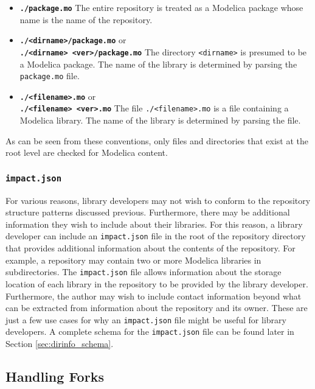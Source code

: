 \documentclass[11pt,a4paper,twocolumn]{article}
\newcommand{\code}[1]{\texttt{#1}} %
\begin{document}
\begin{itemize}[noitemsep]
  \item \textbf{\code{./package.mo}} The entire repository is treated as a Modelica
    package whose name is the name of the repository.

  \item \textbf{\code{./<dirname>/package.mo}} or\\  \textbf{\code{./<dirname>
      <ver>/package.mo}} The directory \code{<dirname>} is presumed to
    be a Modelica package.  The name of the library is determined by
    parsing the \code{package.mo} file.

  \item \textbf{\code{./<filename>.mo}} or\\ \textbf{\code{./<filename> <ver>.mo}} The
    file \code{./<filename>.mo} is a file containing a Modelica
    library.  The name of the library is determined by parsing the
    file.
\end{itemize}

As can be seen from these conventions, only files and directories that
exist at the root level are checked for Modelica content.

\subsubsection{\code{impact.json}}
\label{sec:dirinfo}

For various reasons, library developers may not wish to conform to the
repository structure patterns discussed previous.  Furthermore, there
may be additional information they wish to include about their
libraries.  For this reason, a library developer can include an
\code{impact.json} file in the root of the repository directory that
provides additional information about the contents of the repository.
For example, a repository may contain two or more Modelica libraries
in subdirectories.  The \code{impact.json} file allows information
about the storage location of each library in the repository to be
provided by the library developer.  Furthermore, the author may wish
to include contact information beyond what can be extracted from
information about the repository and its owner.  These are just a few
use cases for why an \code{impact.json} file might be useful for
library developers.  A complete schema for the \code{impact.json} file
can be found later in Section \ref{sec:dirinfo_schema}.

\subsection{Handling Forks}
\end{document}
